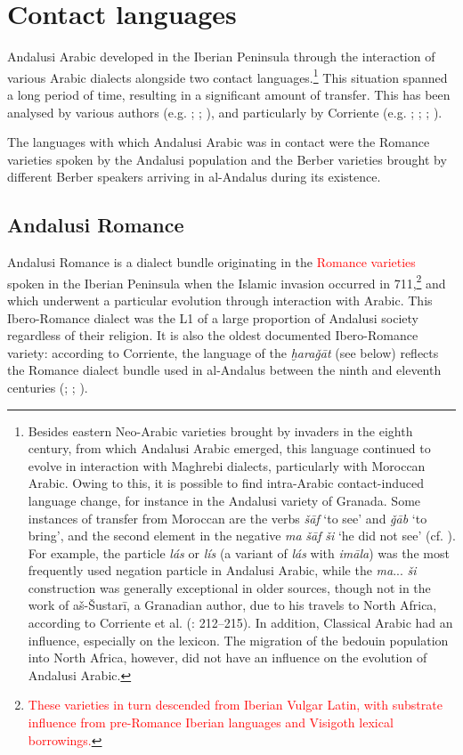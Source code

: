 \documentclass[output=paper,modfonts,nonflat]{langsci/langscibook}
\begin{document}
\section{Contact languages}
Andalusi Arabic developed in the Iberian Peninsula through the interaction of various Arabic dialects alongside two contact languages.\footnote{Besides eastern Neo-Arabic varieties brought by invaders in the eighth century, from which Andalusi Arabic emerged, this language continued to evolve in interaction with Maghrebi dialects, particularly with Moroccan Arabic. Owing to this, it is possible to find intra-Arabic contact-induced language change, for instance in the Andalusi variety of Granada. Some instances of transfer from Moroccan are the verbs \textit{šāf} ‘to see’ and \textit{ǧāb} ‘to bring’, and the second element in the negative \textit{ma} \textit{šāf} \textit{ši} ‘he did not see’ (cf. \citealt[57]{Corriente1998stress}). For example, the particle \textit{lás} or \textit{lís} (a variant of \textit{lás} with \textit{imāla})  was the most frequently used negation particle in Andalusi Arabic, while the \textit{ma}... \textit{ši} construction was generally exceptional in older sources, though not in the work of aš-Šustarī, a Granadian author, due to his travels to North Africa, according to Corriente et al. (\citeyear{CorrientePereiraVicente2015}: 212--215). In addition, Classical Arabic had an influence, especially on the lexicon. The migration of the bedouin population into North Africa, however, did not have an influence on the evolution of Andalusi Arabic.} This situation spanned a long period of time, resulting in a significant amount of transfer. This has been analysed by various authors (e.g. \citealt{Ferrando1995}; \citeyear{Ferrando1997}; \citealt{Vicente2006}), and particularly by Corriente (e.g. \citealt{Corriente1981}; \citeyear{Corriente1992book}; \citeyear{Corriente2000}; \citeyear{Corriente2002}). 

The languages with which Andalusi Arabic was in contact were the Romance varieties spoken by the Andalusi population and the Berber varieties brought by different Berber speakers arriving in al-Andalus during its existence. 

\subsection{Andalusi Romance}\label{AR}

Andalusi Romance is a dialect bundle originating in the \textcolor{red}{Romance varieties} spoken in the Iberian Peninsula when the Islamic invasion occurred in 711,\footnote{\textcolor{red}{These varieties in turn descended from Iberian Vulgar Latin, with substrate influence from pre-Romance Iberian languages and Visigoth lexical borrowings.}} and  which underwent a particular evolution through interaction with Arabic. This Ibero-Romance dialect was the L1 of a large proportion of Andalusi society regardless of their religion. It is also the oldest documented Ibero-Romance variety: according to Corriente, the language of the \textit{ḫaraǧāt} (see below) reflects the Romance dialect bundle used in al-Andalus between the ninth and eleventh centuries (\citealt{Corriente1995}; \citeyear{Corriente1997poetry}; \citeyear{Corriente2000}). 
\end{document}
